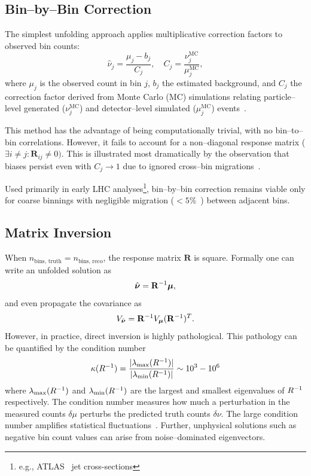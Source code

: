 \subsection{Bin--by--Bin Correction}  
The simplest unfolding approach applies multiplicative correction factors to observed bin counts:  
\begin{equation}
    \hat{\nu}_j = \frac{\mu_j - b_j}{C_j}, \quad C_j = \frac{\nu^{\text{MC}}_j}{\mu^{\text{MC}}_j},
\end{equation}  
where \(\mu_j\) is the observed count in bin \(j\), \(b_j\) the estimated background, and \(C_j\) the correction factor derived from Monte Carlo (MC) simulations relating particle--level generated (\(\nu^{\text{MC}}_j\)) and detector--level simulated (\(\mu^{\mathrm{MC}}_j\)) events~\cite{cowan_statistics_2021}. 

This method has the advantage of being computationally trivial, with no bin--to--bin correlations.
%
However, it fails to account for a non--diagonal response matrix (\(\exists i \neq j: \mathbf{R}_{ij} \ne 0)\).
%
This is illustrated most dramatically by the observation that biases persist even with \(C_j \rightarrow 1\) due to ignored cross--bin migrations~\cite{cowan_topics_2010}.

Used primarily in early LHC analyses\footnote{e.g., ATLAS~\cite{aad_measurement_2011, noauthor_implications_nodate} jet cross-sections}, bin--by--bin correction remains viable only for coarse binnings with negligible migration (\(<5\%\)~\cite{cms_collaboration_measurement_2011}) between adjacent bins.

\subsection{Matrix Inversion}  
When \(n_{\text{bins, truth}} = n_{\text{bins, reco}}\), the response matrix $\mathbf{R}$ is square.
%
Formally one can write an unfolded solution as  
\begin{equation}
    \hat{\boldsymbol{\nu}} = \mathbf{R}^{-1}\vb*{\mu},
\end{equation}  
and even propagate the covariance as  
\begin{equation}
    V_{\hat{\boldsymbol{\nu}}} = \mathbf{R}^{-1} V_{\vb*{\mu}} (\mathbf{R}^{-1})^T.
\end{equation}  
However, in practice, direct inversion is highly pathological.
%
This pathology can be quantified by the condition number
\begin{equation}
    \kappa(R^{-1}) = \frac{|\lambda_{\mathrm{max}}(R^{-1})|}{|\lambda_{\mathrm{min}}(R^{-1})|} \sim 10^3 - 10^6
\end{equation}
where $\lambda_{\mathrm{max}}(R^{-1})$ and $\lambda_{\mathrm{min}}(R^{-1})$ are the largest and smallest eigenvalues of $R^{-1}$ respectively.
%
The condition number measures how much a perturbation in the measured counts $\delta\mu$ perturbs the predicted truth counts $\delta\nu$.
%
The large condition number amplifies statistical fluctuations~\cite{belsley_regression_2005, pesaran_time_2015}.
%
Further, unphysical solutions such as negative bin count values can arise from noise--dominated eigenvectors.


